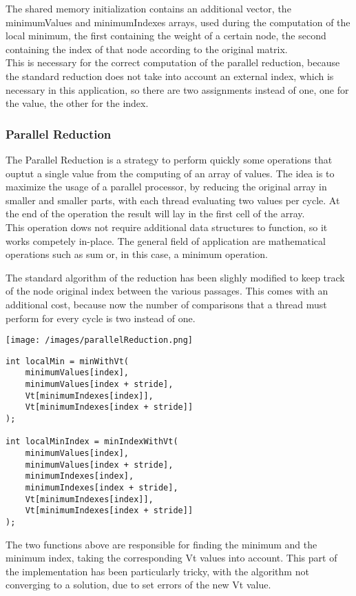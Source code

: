 \documentclass[
	a4paper, %
	12pt, %
]{class}
\begin{document}
The shared memory initialization contains an additional vector, the minimumValues and minimumIndexes arrays, used during the computation of the local minimum,
the first containing the weight of a certain node, the second containing the index of that node according to the original matrix.\\

This is necessary for the correct computation of the parallel reduction, because the standard reduction does not take into account an external index, which is necessary
in this application, so there are two assignments instead of one, one for the value, the other for the index.

\subsubsection{Parallel Reduction}
The Parallel Reduction is a strategy to perform quickly some operations that ouptut a single value from the computing of an array of values.
The idea is to maximize the usage of a parallel processor, by reducing the original array in smaller and smaller parts, with each thread evaluating two values per cycle.
At the end of the operation the result will lay in the first cell of the array.\\

This operation dows not require additional data structures to function, so it works competely in-place. The general field of application are mathematical operations such as sum or, in this case, a
minimum operation.

The standard algorithm of the reduction has been slighly modified to keep track of the node original index between the various passages. This comes with an additional
cost, because now the number of comparisons that a thread must perform for every cycle is two instead of one.


\begin{center}
    \texttt{[image: /images/parallelReduction.png]}
\end{center}
\begin{verbatim}
int localMin = minWithVt(
    minimumValues[index],
    minimumValues[index + stride],
    Vt[minimumIndexes[index]],
    Vt[minimumIndexes[index + stride]]
);

int localMinIndex = minIndexWithVt(
    minimumValues[index],
    minimumValues[index + stride],
    minimumIndexes[index],
    minimumIndexes[index + stride],
    Vt[minimumIndexes[index]],
    Vt[minimumIndexes[index + stride]]
);
\end{verbatim}
The two functions above are responsible for finding the minimum and the minimum index, taking the corresponding Vt values into account.
This part of the implementation has been particularly tricky, with the algorithm not converging to a solution, due to set errors of the new Vt value.\\
\end{document}
